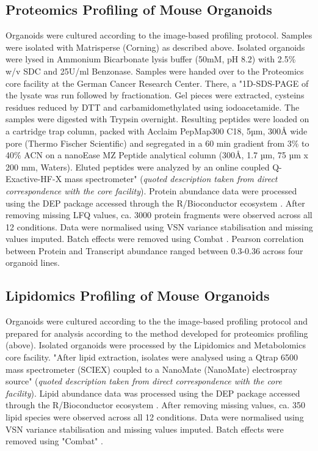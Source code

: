 \begin{flushleft}
\subsection{Proteomics Profiling of Mouse Organoids}
Organoids were cultured according to the image-based profiling protocol. Samples were isolated with Matrisperse (Corning) as described above. Isolated organoids were lysed in Ammonium Bicarbonate lysis buffer (50mM, pH 8.2) with 2.5\% w/v SDC and 25U/ml Benzonase. 
\bigbreak
Samples were handed over to the Proteomics core facility at the German Cancer Research Center. There, a "1D-SDS-PAGE of the lysate was run followed by fractionation. Gel pieces were extracted, cysteins residues reduced by DTT and carbamidomethylated using iodoacetamide. The samples were digested with Trypsin overnight.
Resulting peptides were loaded on a cartridge trap column, packed with Acclaim PepMap300 C18, 5µm, 300Å wide pore (Thermo Fischer Scientific) and segregated in a 60 min gradient from 3\% to 40\% ACN on a nanoEase MZ Peptide analytical column (300Å, 1.7 µm, 75 µm x 200 mm, Waters). Eluted peptides were analyzed by an online coupled Q-Exactive-HF-X mass spectrometer" (\textit{quoted description taken from direct correspondence with the core facility}).
\bigbreak
Protein abundance data were processed using the DEP package \parencite{zhangProteomewideIdentificationUbiquitin2018} accessed through the R/Bioconductor ecosystem \parencite{huberOrchestratingHighthroughputGenomic2015}. After removing missing LFQ values, ca. 3000 protein fragments were observed across all 12 conditions. Data were normalised using VSN variance stabilisation \parencite{huberVarianceStabilizationApplied2002} and missing values imputed. Batch effects were removed using Combat \parencite{leekCapturingHeterogeneityGene2007}. 
Pearson correlation between Protein and Transcript abundance ranged between 0.3-0.36 across four organoid lines. 

\subsection{Lipidomics Profiling of Mouse Organoids}
Organoids were cultured according to the the image-based profiling protocol and prepared for analysis according to the method developed for proteomics profiling (above). 
Isolated organoids were processed by the Lipidomics and Metabolomics core facility. 
"After lipid extraction, isolates were analysed using a Qtrap 6500 mass spectrometer (SCIEX) coupled to a NanoMate (NanoMate) electrospray source" (\textit{quoted description taken from direct correspondence with the core facility}).
\bigbreak
Lipid abundance data was processed using the DEP package \parencite{zhangProteomewideIdentificationUbiquitin2018} accessed through the R/Bioconductor ecosystem \parencite{huberOrchestratingHighthroughputGenomic2015}. After removing missing values, ca. 350 lipid species were observed across all 12 conditions. Data were normalised using VSN variance stabilisation \parencite{huberVarianceStabilizationApplied2002} and missing values imputed. Batch effects were removed using "Combat" \parencite{leekCapturingHeterogeneityGene2007}. 


\end{flushleft}
